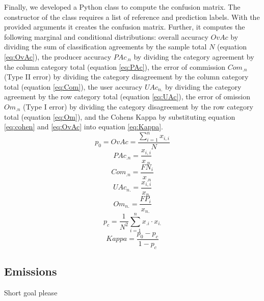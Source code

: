 			Finally, we developed a Python class to compute the confusion matrix. The constructor of the class requires a list of reference and prediction labels. With the provided arguments it creates the confusion matrix. Further, it computes the following marginal and conditional distributions: overall accuracy $OvAc$ by dividing the sum of classification agreements by the sample total $N$ (equation \ref{eq:OvAc}), the producer accuracy $PAc_{.n}$ by dividing the category agreement by the column category total (equation \ref{eq:PAc}), the error of commission $Com_{.n}$ (Type II error) by dividing the category disagreement by the column category total (equation \ref{eq:Com}), the user accuracy $UAc_{n.}$ by dividing the category agreement by the row category total (equation \ref{eq:UAc}), the error of omission $Om_{.n}$ (Type I error) by dividing the category disagreement by the row category total (equation \ref{eq:Om}), and the Cohens Kappa by substituting equation \ref{eq:cohen} and \ref{eq:OvAc} into equation \ref{eq:Kappa}.
			\begin{equation}
			\label{eq:OvAc}
				p_0=OvAc = \frac{\displaystyle\sum_{i=1}^{n}x_{i,i}}{N}
			\end{equation}
			\begin{equation}
			\label{eq:PAc}
				PAc_{.n} = \frac{x_{i,i}}{x_{.n}}
			\end{equation}
			\begin{equation}
			\label{eq:Com}
				Com_{.n} = \frac{FN_i}{x_{.n}}
			\end{equation}
			\begin{equation}
			\label{eq:UAc}
				UAc_{n.} = \frac{x_{i,i}}{x_{n.}}
			\end{equation}
			\begin{equation}
			\label{eq:Om}
				Om_{n.} = \frac{FP_i}{x_{n.}}
			\end{equation}
			\begin{equation}
			\label{eq:cohen}
				p_c = \frac{1}{N^2}\displaystyle\sum_{i=1}^{n} x_{.i} \cdot x_{i.}
			\end{equation}
			\begin{equation}
			\label{eq:Kappa}
				Kappa = \frac{p_0-p_c}{1-p_c}
			\end{equation}

	\subsection{Emissions}
		Short goal please

